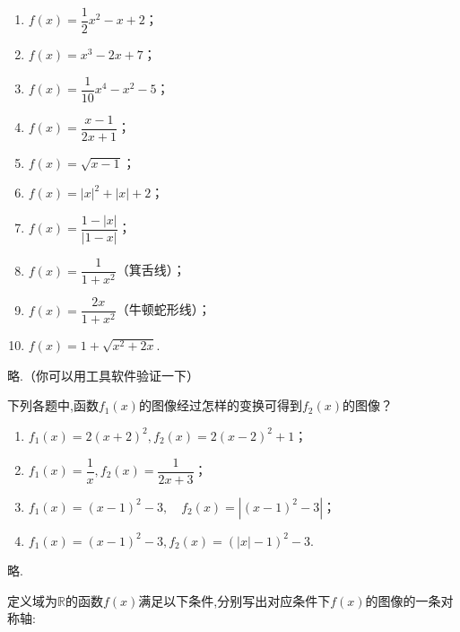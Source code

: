 \documentclass[lang=cn,newtx,10pt,scheme=chinese]{elegantbook}
\begin{document}
\begin{spacing}{1.8}
  \begin{enumerate}
    \item $f(x)=\dfrac12 x^2-x+2$；
    \item $f(x)=x^3-2x+7$；
    \item $f(x)=\dfrac{1}{10}x^4-x^2-5$；
    \item $f(x)=\dfrac{x-1}{2x+1}$；
    \item $f(x)=\sqrt{x-1}$；
    \item $f(x)=\left|x\right|^2+\left|x\right|+2$；
    \item $f(x)=\dfrac{1-\left|x\right|}{\left|1-x\right|}$；
    \item $f(x)=\dfrac{1}{1+x^2}$（箕舌线）；
    \item $f(x)=\dfrac{2x}{1+x^2}$（牛顿蛇形线）；
    \item $f(x)=1+\sqrt{x^{2}+2x}$.
  \end{enumerate}
\end{spacing}

\begin{solution}
  略.（你可以用工具软件验证一下）
\end{solution}

\begin{exercise}\label{BJSZ.Algebra1.P58-59.changed}
  下列各题中,函数$f_1(x)$的图像经过怎样的变换可得到$f_2(x)$的图像？
\end{exercise}

\begin{spacing}{1.7}
  \begin{enumerate}
    \item $f_{1}(x)=2(x+2)^{2}, f_{2}(x)=2(x-2)^{2}+1$；
    \item $f_{1}(x)=\dfrac{1}{x}, f_{2}(x)=\dfrac{1}{2x+3}$；
    \item $f_{1}\left(x\right)=\left(x-1\right)^{2}-3,\quad f_{2}\left(x\right)=\left|\left(x-1\right)^{2}-3\right|$；
    \item $f_{1}(x)=(x-1)^{2}-3,f_{2}(x)=(|x|-1)^{2}-3$.
  \end{enumerate}
\end{spacing}

\begin{solution}
  略.
\end{solution}

\begin{exercise}
  定义域为$\mathbb{R}$的函数$f(x)$满足以下条件,分别写出对应条件下$f(x)$的图像的一条对称轴:
\end{exercise}
\end{document}

